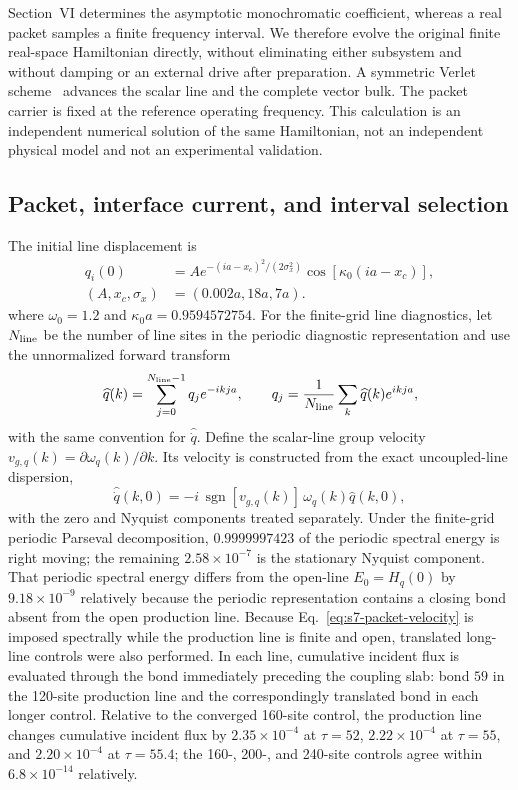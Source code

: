 \documentclass[10pt,aps,pre,reprint,floatfix,notitlepage,nofootinbib]{revtex4-2}
\begin{document}
Section~VI determines the asymptotic monochromatic coefficient, whereas a real packet samples a finite frequency interval.  We therefore evolve the original finite real-space Hamiltonian directly, without eliminating either subsystem and without damping or an external drive after preparation.  A symmetric Verlet scheme~\cite{Verlet1967} advances the scalar line and the complete vector bulk.  The packet carrier is fixed at the reference operating frequency.  This calculation is an independent numerical solution of the same Hamiltonian, not an independent physical model and not an experimental validation.

\subsection{Packet, interface current, and interval selection}
\label{sec:s7-packet}

The initial line displacement is
\begin{align}
 q_i(0)
 &=A e^{-(ia-x_c)^2/(2\sigma_x^2)}
 \cos[\kappa_0(ia-x_c)],\\
 (A,x_c,\sigma_x)&=(0.002a,18a,7a).
 \label{eq:s7-packet}
\end{align}
where $\omega_0=1.2$ and $\kappa_0a=0.9594572754$.  For the finite-grid line diagnostics, let $N_{\rm line}$ be the number of line sites in the periodic diagnostic representation and use the unnormalized forward transform
\begin{equation}
 \widehat q(k)=\sum_{j=0}^{N_{\rm line}-1}q_j e^{-ikja},
 \qquad
 q_j=\frac{1}{N_{\rm line}}\sum_k\widehat q(k)e^{ikja},
 \label{eq:s7-line-dft}
\end{equation}
with the same convention for $\widehat{\dot q}$. Define the scalar-line group velocity $v_{g,q}(k)=\partial\omega_q(k)/\partial k$. Its velocity is constructed from the exact uncoupled-line dispersion,
\begin{equation}
 \widehat{\dot q}(k,0)
 =-i\,\operatorname{sgn}[v_{g,q}(k)]\,
 \omega_q(k)\widehat q(k,0),
 \label{eq:s7-packet-velocity}
\end{equation}
with the zero and Nyquist components treated separately.  Under the finite-grid periodic Parseval decomposition, $0.9999997423$ of the periodic spectral energy is right moving; the remaining $2.58\times10^{-7}$ is the stationary Nyquist component. That periodic spectral energy differs from the open-line $E_0=H_q(0)$ by $9.18\times10^{-9}$ relatively because the periodic representation contains a closing bond absent from the open production line.  Because Eq.~\eqref{eq:s7-packet-velocity} is imposed spectrally while the production line is finite and open, translated long-line controls were also performed. In each line, cumulative incident flux is evaluated through the bond immediately preceding the coupling slab: bond $59$ in the 120-site production line and the correspondingly translated bond in each longer control. Relative to the converged 160-site control, the production line changes cumulative incident flux by $2.35\times10^{-4}$ at $\tau=52$, $2.22\times10^{-4}$ at $\tau=55$, and $2.20\times10^{-4}$ at $\tau=55.4$; the 160-, 200-, and 240-site controls agree within $6.8\times10^{-14}$ relatively.
\end{document}
